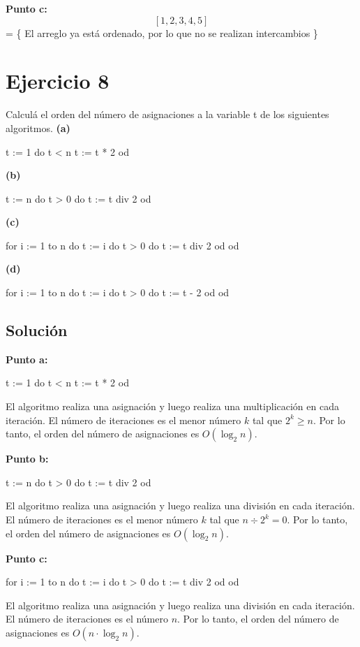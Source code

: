\documentclass{article}
\begin{document}
\textbf{Punto c:}
$$[1, 2, 3, 4, 5]$$
= \{ El arreglo ya está ordenado, por lo que no se realizan intercambios \}

\section*{Ejercicio 8}
Calculá el orden del número de asignaciones a la variable t de los siguientes algoritmos.
\newline \textbf{(a)}
\begin{pascallike}
t := 1
do t < n 
  t := t * 2
od
\end{pascallike}

\textbf{(b)}
\begin{pascallike}
t := n
do t > 0 do
  t := t div 2
od
\end{pascallike}

\textbf{(c)}
\begin{pascallike}
for i := 1 to n do
  t := i
  do t > 0 do
    t := t div 2
  od
od
\end{pascallike} 

\textbf{(d)}
\begin{pascallike}
for i := 1 to n do
  t := i
  do t > 0 do
    t := t - 2
  od
od
\end{pascallike}

\subsection*{Solución}
\textbf{Punto a:}
\begin{pascallike}
t := 1
do t < n 
  t := t * 2
od
\end{pascallike}
El algoritmo realiza una asignación y luego realiza una multiplicación en cada iteración. El número de iteraciones es el menor número $k$ tal que $2^k \geq n$. Por lo tanto, el orden del número de asignaciones es $O(\log_2 n)$.

\newpage
\textbf{Punto b:}
\begin{pascallike}
t := n
do t > 0 do
  t := t div 2
od
\end{pascallike}
El algoritmo realiza una asignación y luego realiza una división en cada iteración. El número de iteraciones es el menor número $k$ tal que $n \div 2^k = 0$. Por lo tanto, el orden del número de asignaciones es $O(\log_2 n)$.

\textbf{Punto c:}
\begin{pascallike}
for i := 1 to n do
  t := i
  do t > 0 do
    t := t div 2
  od
od
\end{pascallike}
El algoritmo realiza una asignación y luego realiza una división en cada iteración. El número de iteraciones es el número $n$. Por lo tanto, el orden del número de asignaciones es $O(n \cdot \log_2 n)$.
\end{document}
